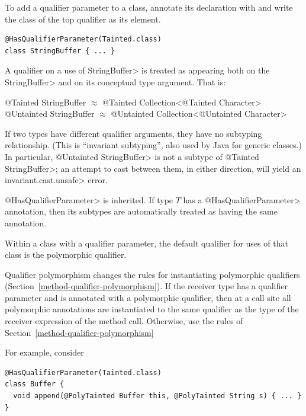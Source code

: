 To add a qualifier parameter to a class, annotate its declaration with 
and write the class of the top qualifier as its element.

\begin{Verbatim}
@HasQualifierParameter(Tainted.class)
class StringBuffer { ... }
\end{Verbatim}

A qualifier on a use of \<StringBuffer> is treated as
appearing both on the \<StringBuffer> and on its conceptual type argument.  That
is:\\
\begin{tt}
  @Tainted StringBuffer $\approx$ @Tainted Collection<@Tainted Character>\\
  @Untainted StringBuffer $\approx$ @Untainted Collection<@Untainted Character>
\end{tt}

If two types have different qualifier arguments, they have no subtyping
relationship.  (This is ``invariant subtyping'', also used by Java for
generic classes.)  In particular, \<@Untainted StringBuffer> is not a
subtype of \<@Tainted StringBuffer>; an attempt to cast between them, in
either direction, will yield an \<invariant.cast.unsafe> error.

\<@HasQualifierParameter> is inherited.  If type $T$ has a
\<@HasQualifierParameter> annotation, then its subtypes are automatically
treated as having the same annotation.


Within a class with a qualifier parameter,
the default qualifier for uses of that class is the polymorphic qualifier.



Qualifier polymorphism changes the rules for instantiating polymorphic
qualifiers (Section~\ref{method-qualifier-polymorphism}).
If the receiver type has a qualifier parameter and is annotated with a polymorphic qualifier,
then at a call site all polymorphic annotations are instantiated to
the same qualifier as the type of the receiver expression of the method call.
Otherwise, use the rules of Section~\ref{method-qualifier-polymorphism}

For example, consider

\begin{Verbatim}
@HasQualifierParameter(Tainted.class)
class Buffer {
  void append(@PolyTainted Buffer this, @PolyTainted String s) { ... }
}
\end{Verbatim}

